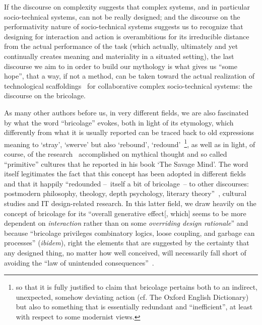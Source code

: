 \documentclass{article}
\begin{document}
If the discourse on complexity suggests that complex systems, and in particular socio-technical systems, can not be really designed; and the discourse on the performativity nature of socio-technical systems suggests us to recognize that designing for interaction and action is overambitious for its irreducible distance from the actual performance of the task (which actually, ultimately and yet continually creates meaning and materiality in a situated setting), the last discourse we aim to in order to build our mythology is what gives us ``some hope'', that a way, if not a method, can be taken toward the actual realization of technological scaffoldings~\citep{orlikowski_material_2006} for collaborative complex socio-technical systems: the discourse on the bricolage.

As many other authors before us, in very different fields, we are also fascinated by what the word ``bricolage'' evokes, both in light of its etymology, which differently from what it is usually reported can be traced back to old expressions meaning to `stray', `swerve' but also `rebound', `redound'~\citep{miller_bricoleur_1996}\footnote{so that it is fully justified to claim that bricolage pertains both to an indirect, unexpected, somehow deviating action (cf. The Oxford English Dictionary) but also to something that is essentially redundant and ``inefficient'', at least with respect to some modernist views.}, as well as in light, of course, of the research~\citet{levi-strauss_savage_1966} accomplished on mythical thought and so called ``primitive'' cultures that he reported in his book `The Savage Mind'. The word itself legitimates the fact that this concept has been adopted in different fields and that it happily ``redounded --~itself a bit of bricolage~-- to other discourses: postmodern philosophy, theology, depth psychology, literary theory''~\citep{miller_bricoleur_1996}, cultural studies and IT design-related research. In this latter field, we draw heavily on the concept of bricolage for its ``overall generative effect[, which] seems to be more dependent on \emph{interaction} rather than on some \emph{overriding design rationale}''\citep[our emphasis][p. 347]{lanzara_between_1999} and because ``bricolage privileges combinatory logics, loose coupling, and garbage can processes'' (\textit{ibidem}), right the elements that are suggested by the certainty that any designed thing, no matter how well conceived, will necessarily fall short of avoiding the ``law of unintended consequences''~\citep{mansfield_nature_2010}.
\end{document}
